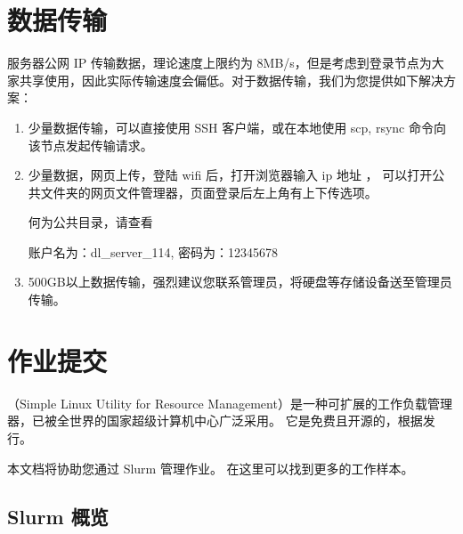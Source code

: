 \documentclass[a4paper,12pt,english]{sphinxmanual}
\begin{document}
\chapter{数据传输}
\label{\detokenize{transport/index:label-transfer}}\label{\detokenize{transport/index:id1}}\label{\detokenize{transport/index::doc}}
\sphinxAtStartPar
服务器公网 IP 传输数据，理论速度上限约为 8MB/s，但是考虑到登录节点为大家共享使用，因此实际传输速度会偏低。对于数据传输，我们为您提供如下解决方案：
\begin{enumerate}
%
\item {} 
\sphinxAtStartPar
少量数据传输，可以直接使用 SSH 客户端，或在本地使用 scp, rsync 命令向该节点发起传输请求。

\item {} 
\sphinxAtStartPar
少量数据，网页上传，登陆 wifi 后，打开浏览器输入 ip 地址 ， 可以打开公共文件夹的网页文件管理器，页面登录后左上角有上下传选项。

\sphinxAtStartPar
何为公共目录，请查看 

\sphinxAtStartPar
账户名为：dl\_server\_114, 密码为：12345678

\noindent{}

\noindent{}

\item {} 
\sphinxAtStartPar
500GB以上数据传输，强烈建议您联系管理员，将硬盘等存储设备送至管理员传输。

\end{enumerate}


\chapter{作业提交}
\label{\detokenize{job/index:id1}}\label{\detokenize{job/index::doc}}
\sphinxAtStartPar
{} （Simple Linux Utility for Resource Management）是一种可扩展的工作负载管理器，已被全世界的国家超级计算机中心广泛采用。
它是免费且开源的，根据发行。

\sphinxAtStartPar
本文档将协助您通过 Slurm 管理作业。 在这里可以找到更多的工作样本。


\section{Slurm 概览}
\label{\detokenize{job/index:id2}}
\end{document}
